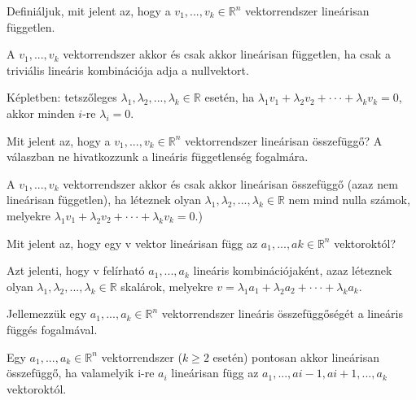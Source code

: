 \begin{frame}
  \begin{tcolorbox}[title={2}]
      Definiáljuk, mit jelent az, hogy a $v_1,...,v_k \in \mathbb{R}^n$ vektorrendszer lineárisan független.

  \tcblower
A $v_1,...,v_k$ vektorrendszer akkor és csak akkor lineárisan független, ha csak a triviális lineáris kombinációja adja a nullvektort.\\
\mmedskip

Képletben: tetszőleges ${\lambda}_1,{\lambda}_2,...,{\lambda}_k \in \mathbb{R}$ esetén, ha ${\lambda}_1v_1 + {\lambda}_2v_2 +  \cdot  \cdot  \cdot  + {\lambda}_kv_k = 0$, akkor minden $i$-re ${\lambda}_i = 0$.
  \end{tcolorbox}
\end{frame}


\begin{frame}
  \begin{tcolorbox}[title={3}]
      Mit jelent az, hogy a $v_1,...,v_k \in \mathbb{R}^n$ vektorrendszer lineárisan összefüggő? A válaszban ne hivatkozzunk a lineáris függetlenség fogalmára.


  \tcblower
A $v_1,...,v_k$ vektorrendszer akkor és csak akkor lineárisan összefüggő (azaz nem lineárisan független), ha léteznek olyan ${\lambda}_1,{\lambda}_2,...,{\lambda}_k \in \mathbb{R}$ nem mind nulla számok, melyekre ${\lambda}_1v_1 + {\lambda}_2v_2 +  \cdot  \cdot  \cdot  + {\lambda}_kv_k = 0$.)

  \end{tcolorbox}
\end{frame}

\begin{frame}
  \begin{tcolorbox}[title={4}]
     Mit jelent az, hogy egy v vektor lineárisan függ az $a_1,...,ak \in \mathbb{R}^n$ vektoroktól?

  \tcblower
Azt jelenti, hogy v felírható $a_1,...,a_k$ lineáris kombinációjaként, azaz léteznek olyan ${\lambda}_1,{\lambda}_2,...,{\lambda}_k \in \mathbb{R}$ skalárok, melyekre $v = {\lambda}_1a_1 + {\lambda}_2a_2 +  \cdot  \cdot  \cdot  + {\lambda}_ka_k$.
  \end{tcolorbox}
\end{frame}


\begin{frame}
  \begin{tcolorbox}[title={5}]
    Jellemezzük egy $a_1,...,a_k \in \mathbb{R}^n$ vektorrendszer lineáris összefüggőségét a lineáris függés fogalmával.


  \tcblower
Egy $a_1,...,a_k \in \mathbb{R}^n$ vektorrendszer ($k \geq 2$ esetén) pontosan akkor lineárisan összefüggő, ha valamelyik i-re $a_i$ lineárisan függ az $a_1,...,ai-1,ai+1,...,a_k$ vektoroktól.
  \end{tcolorbox}
\end{frame}


